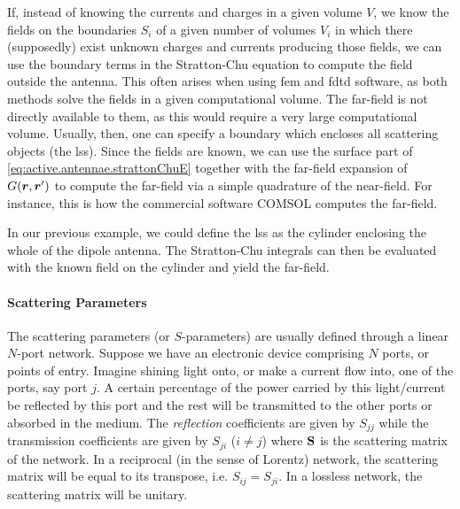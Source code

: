 		\begin{exmp}\label{ex:active.antennae.nearToFarTrans}
			If, instead of knowing the currents and charges in a given volume $V$, we know the 
			fields on the boundaries $S_i$ of a given number of volumes $V_i$ in which there (supposedly) exist
			unknown charges and currents producing those fields, we can use the boundary terms in the Stratton-Chu
			equation to compute the field outside the antenna. This often arises when using \gls{fem}
			and \gls{fdtd} software, as both methods solve the fields in a given computational volume. The
			far-field is not directly available to them, as this would require a very large computational volume.
			Usually, then, one can specify a boundary which encloses all scattering objects (the \gls{lss}). 
			Since the fields are known, we can use the surface part of \eqref{eq:active.antennae.strattonChuE}
			together with the far-field expansion of $G(\boldsymbol{r},\boldsymbol{r}')$ to compute the far-field via a simple
			quadrature of the near-field. For instance, this is how the commercial software COMSOL computes the
			far-field.
			
			In our previous example, we could define the \gls{lss} as the cylinder enclosing
			the whole of the dipole antenna. The Stratton-Chu integrals can then be evaluated 
			with the known field on the cylinder and yield the far-field. 
			\end{exmp}
	

\paragraph{Scattering Parameters}
The scattering parameters (or $S$-parameters) are
usually defined through a linear $N$-port network. 
Suppose we have an electronic device comprising
$N$ ports, or points of entry. Imagine shining light onto, 
or make a current flow into,
one of the ports, say port $j$. A certain percentage
of the power carried by this light/current be reflected 
by this port and the rest will be transmitted to the
other ports or absorbed in the medium. The \textit{reflection}
coefficients are given by $S_{jj}$ while the transmission
coefficients are given by $S_{ji}$ ($i\neq j$) where $\mathbf{S}$
is the scattering matrix of the network. In a reciprocal (in the sense
of Lorentz) network, the scattering matrix will be equal to its
transpose, i.e. $S_{ij}=S_{ji}$. In a lossless network, the scattering
matrix will be unitary. 

